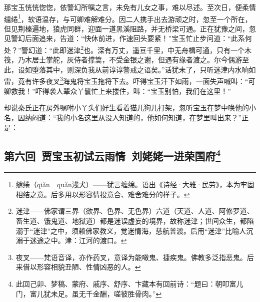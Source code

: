 \par 那宝玉恍恍惚惚，依警幻所嘱之言，未免有儿女之事，难以尽述。至次日，便柔情缱绻\footnote{缱绻（qiǎn　quǎn浅犬）——犹言缠绵。语出《诗经·大雅·民劳》，本为牢固相结之意。后多用以形容情投意合、难舍难分的样子。}，软语温存，与可卿难解难分。因二人携手出去游顽之时，忽至一个所在，但见荆榛遍地，狼虎同群，迎面一道黑溪阻路，并无桥梁可通。正在犹豫之间，忽见警幻后面追来，告道：“快休前进，作速回头要紧！”宝玉忙止步问道：“此系何处？”警幻道：“此即迷津\footnote{迷津——佛家谓三界（欲界、色界、无色界）六道（天道、人道、阿修罗道、畜生道、饿鬼道、地狱道）都是迷误虚妄的境界，故称迷津；世间众生，都陷溺于“迷津”之中，须赖佛家教义，觉迷情海，慈航普渡。后用“迷津”比喻人沉溺于迷途之中。津：江河的渡口。}也。深有万丈，遥亘千里，中无舟楫可通，只有一个木筏，乃木居士掌舵，灰侍者撑篙，不受金银之谢，但遇有缘者渡之。尔今偶游至此，设如堕落其中，则深负我从前谆谆警戒之语矣。”话犹未了，只听迷津内水响如雷，竟有许多夜叉\footnote{夜叉——梵语音译，亦作药叉，意译为能噉鬼、捷疾鬼。佛教多泛指恶鬼。后来借以形容相貌丑陋、性情凶恶的人。}海鬼将宝玉拖将下去。吓得宝玉汗下如雨，一面失声喊叫：“可卿救我！”吓得袭人辈众丫鬟忙上来搂住，叫：“宝玉别怕，我们在这里！”
\par 却说秦氏正在房外嘱咐小丫头们好生看着猫儿狗儿打架，忽听宝玉在梦中唤他的小名，因纳闷道：“我的小名这里从没人知道的，他如何知道，在梦里叫出来？”正是：




\subsection*{第六回\ 贾宝玉初试云雨情\ 刘姥姥一进荣国府\footnote{此回己卯、梦稿、蒙府、戚序、舒序、卞藏本有回前诗：“题曰：朝叩富儿门，富儿犹未足。虽无千金酬，嗟彼胜骨肉。”}}

